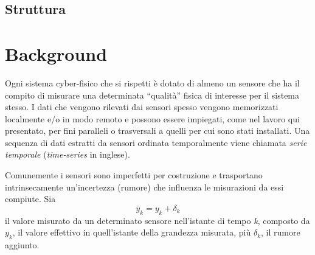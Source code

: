 \documentclass[Lau,binding=0.6cm]{sapthesis}
\begin{document}
\section{Struttura}



\chapter{Background}


Ogni sistema cyber-fisico che si rispetti è dotato di almeno un sensore che ha il compito di misurare una determinata ``qualità'' fisica di interesse per il sistema stesso. 
I dati che vengono rilevati dai sensori spesso vengono memorizzati localmente e/o in modo remoto e possono essere impiegati,
come nel lavoro qui presentato, per fini paralleli o trasversali a quelli per cui sono stati installati.
Una sequenza di dati estratti da sensori ordinata temporalmente viene chiamata \textit{serie temporale} (\textit{time-series} in inglese).

Comunemente i sensori sono imperfetti per costruzione e trasportano intrinsecamente un'incertezza (rumore) che influenza le misurazioni da essi compiute.
Sia 
\begin{equation}
\bar{y}_{k} = y_{k} + \delta_{k}\label{eq:1}
\end{equation}
il valore misurato da un determinato sensore nell'istante di tempo \textit{k}, composto da $y_k$, il valore effettivo in quell'istante della grandezza misurata, più $\delta_k$, il rumore aggiunto.
\end{document}
